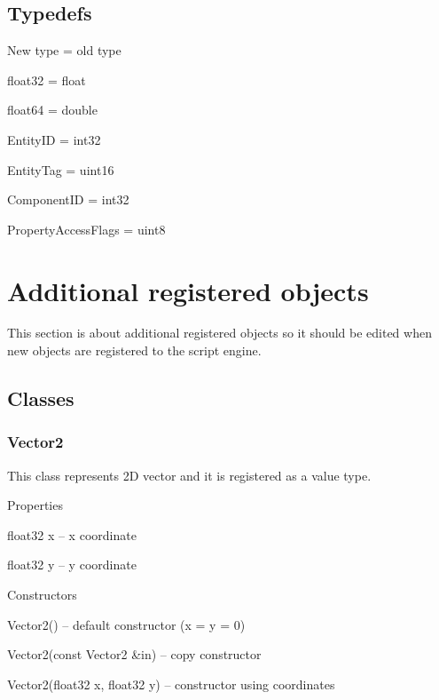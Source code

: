 \subsection{Typedefs}

\begin{titled-itemize}{New type = old type}
	\item float32 = float
	\item float64 = double
	\item EntityID = int32
	\item EntityTag = uint16
	\item ComponentID = int32
	\item PropertyAccessFlags = uint8
\end{titled-itemize}

\section{Additional registered objects}

This section is about additional registered objects so it should be edited when new objects are registered to the script engine.

\subsection{Classes}

\subsubsection{Vector2}

This class represents 2D vector and it is registered as a value type.

\begin{titled-itemize}{Properties}
  \item float32 x -- x coordinate
  \item float32 y -- y coordinate
\end{titled-itemize}

\begin{titled-itemize}{Constructors}
  \item Vector2() -- default constructor (x = y = 0)
  \item Vector2(const Vector2 \&in) -- copy constructor
  \item Vector2(float32 x, float32 y)  -- constructor using coordinates
\end{titled-itemize}

